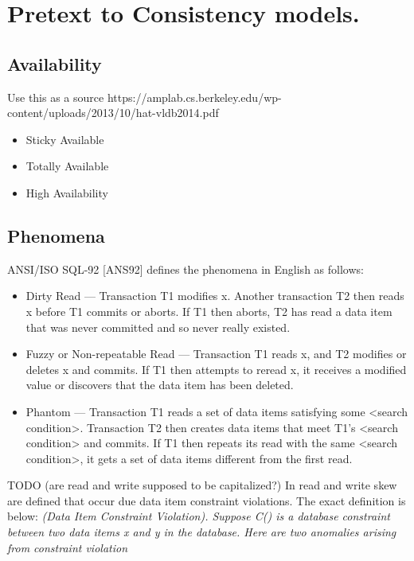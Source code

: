\documentclass[a4paper,10pt,titlepage]{report}
\begin{document}
\newpage
\section{Pretext to Consistency models.}

\subsection{Availability}

Use this as a source https://amplab.cs.berkeley.edu/wp-content/uploads/2013/10/hat-vldb2014.pdf

\begin{itemize}
\item Sticky Available
\item Totally Available
\item High Availability


\end{itemize}


\subsection{Phenomena}


ANSI/ISO SQL-92 [ANS92] defines the phenomena in English as follows:
\begin{itemize}

\item Dirty Read — Transaction T1 modifies x. Another transaction T2 then reads x before T1 commits or aborts. If T1 then aborts, T2 has read a data item that was never committed and so never really existed.

\item Fuzzy or Non-repeatable Read — Transaction T1 reads x, and T2 modifies or deletes x and commits. If T1 then attempts to reread x, it receives a modified value or discovers that the data item has been deleted.
\item Phantom — Transaction T1 reads a set of data items satisfying some <search condition>. Transaction T2 then creates data items that meet T1's <search condition> and commits. If T1 then repeats its read with the same <search condition>, it gets a set of data items different from the first read.
\end{itemize}

TODO (are read and write supposed to be capitalized?)
In \cite{Berensonetal} read and write skew are defined that occur due data item constraint violations. The exact definition is below:
\textit{(Data Item Constraint Violation). Suppose C() is a
database constraint between two data items x and y in the
database. Here are two anomalies arising from constraint
violation}
\end{document}
